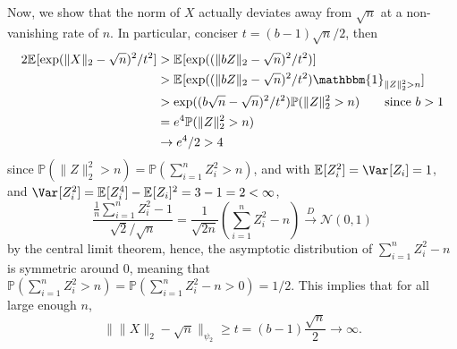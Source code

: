 \begin{answer}
	Now, we show that the norm of \(X \) actually deviates away from \(\sqrt{n} \) at a non-vanishing rate of \(n\). In particular, conciser \(t = (b - 1) \sqrt{n} / 2\), then
	\begin{align*}
		2 \mathbb{E}_{}[\exp (\lVert X \rVert _2 - \sqrt{n} )^2 / t^2]
		 & > \mathbb{E}_{}[\exp ((\lVert b Z \rVert _2 - \sqrt{n} )^2 / t^2)]                                         \\
		 & > \mathbb{E}_{}[\exp ((\lVert b Z \rVert _2 - \sqrt{n} )^2 / t^2) \mathbbm{1}_{\lVert Z \rVert _2^2 > n} ] \\
		 & > \exp ((b \sqrt{n} - \sqrt{n} )^2 / t^2) \mathbb{P} (\lVert Z \rVert _2^2 > n) \tag*{since \(b > 1\)}     \\
		 & = e^4 \mathbb{P} (\lVert Z \rVert _2^2 > n)                                                                \\
		 & \to e^4 / 2 > 4
	\end{align*}
	since \(\mathbb{P} (\lVert Z \rVert _2^2 > n) = \mathbb{P} \left( \sum_{i=1}^{n} Z_i^2 > n \right)\), and with \(\mathbb{E}_{}[Z_i^2] = \Var_{}[Z_i] = 1\), and \(\Var_{}[Z_i^2] = \mathbb{E}_{}[Z_i^4] - \mathbb{E}_{}[Z_i] ^2 = 3 - 1 = 2 < \infty \),
	\[
		\frac{\frac{1}{n} \sum_{i=1}^{n} Z_i^2 - 1}{\sqrt{2} / \sqrt{n} }
		= \frac{1}{\sqrt{2 n} } \left( \sum_{i=1}^{n} Z_i^2 - n \right)
		\overset{D}{\to} \mathcal{N} (0, 1)
	\]
	by the central limit theorem, hence, the asymptotic distribution of \(\sum_{i=1}^{n} Z_i^2 - n\) is symmetric around \(0\), meaning that \(\mathbb{P} (\sum_{i=1}^{n} Z_i^2 > n) = \mathbb{P} (\sum_{i=1}^{n} Z_i^2 - n > 0) = 1 / 2\). This implies that for all large enough \(n\),
	\[
		\lVert \lVert X \rVert _2 - \sqrt{n}  \rVert _{\psi _2}
		\geq t
		= (b-1) \frac{\sqrt{n}}{2}
		\to \infty.
	\]
\end{answer}